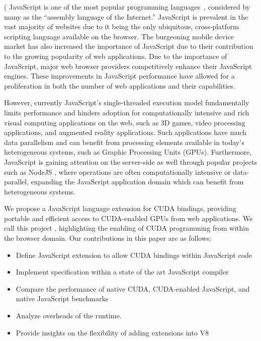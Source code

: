 (
JavaScript is one of the most popular programming languages~\cite{top10}, 
considered by many as the “assembly language of the Internet.” JavaScript is
prevalent in the vast majority of websites due to it being the only
ubiquitous, cross-platform scripting language available on the browser. The 
burgeoning mobile device market has also increased the importance of JavaScript due
to their contribution to the growing  popularity of web applications.
Due to the importance of JavaScript, major web browser providers competitively
enhance their JavaScript engines. These improvements in JavaScript performance
have allowed for a proliferation in both the number of web applications and
their capabilities.  

However, currently JavaScript's single-threaded execution model fundamentally limits
performance and hinders adoption for computationally intensive and rich visual
computing applications on the web, such as 3D games, video processing
applications, and augmented reality applications. Such applications have much data
parallelism and can benefit from processing elements available in today’s
heterogeneous systems, such as Graphic Processing Units (GPUs).  Furthermore,
JavaScript is gaining attention on the server-side as well through popular
projects such as NodeJS \cite{nodeJS}, where operations are often
computationally intensive or data-parallel, expanding the JavaScript application
domain which can benefit from heterogeneous systems.

We propose a JavaScript language extension for CUDA bindings, providing portable
and efficient access to CUDA-enabled GPUs from web applications.  We call this
project \namens, highlighting the enabling of CUDA programming from within the
browser domain. Our contributions in this paper are as follows:


\begin{itemize}

\item Define JavaScript extension to allow CUDA bindings within JavaScript code
\item Implement \name specification within a state of the art JavaScript compiler
\item Compare the performance of native CUDA, CUDA-enabled JavaScript, and native JavaScript benchmarks
\item Analyze overheads of the \name runtime.
\item Provide insights on the flexibility of adding extensions into V8

\end{itemize}

